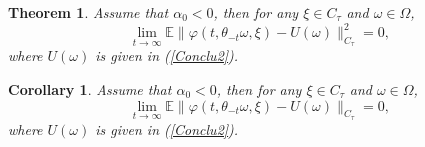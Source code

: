 \documentclass[preprint,12pt]{elsarticle}
\newtheorem{theorem}{Theorem}[section]
\newtheorem{corollary}{Corollary}[section]
\begin{document}
\begin{theorem}\label{thm1-1} Assume that $\alpha_0<0$, then for any $\xi\in C_\tau$ and $\omega\in\Omega$,
\begin{equation}\label{Conclu1-1}
\lim_{t\rightarrow\infty}\mathbb{E}\|\varphi(t,\theta_{-t}\omega,\xi)-U(\omega)\|^2_{C_\tau}
=0,
\end{equation}
where $U(\omega)$ is given in (\ref{Conclu2}).
\end{theorem}

\begin{corollary}\label{cor1} Assume that $\alpha_0<0$, then for any $\xi\in C_\tau$ and $\omega\in\Omega$,
\begin{equation}\label{Conclu1-2}
\lim_{t\rightarrow\infty}\mathbb{E}\|\varphi(t,\theta_{-t}\omega,\xi)-U(\omega)\|_{C_\tau}
=0,
\end{equation}
where $U(\omega)$ is given in (\ref{Conclu2}).
\end{corollary}
\end{document}
